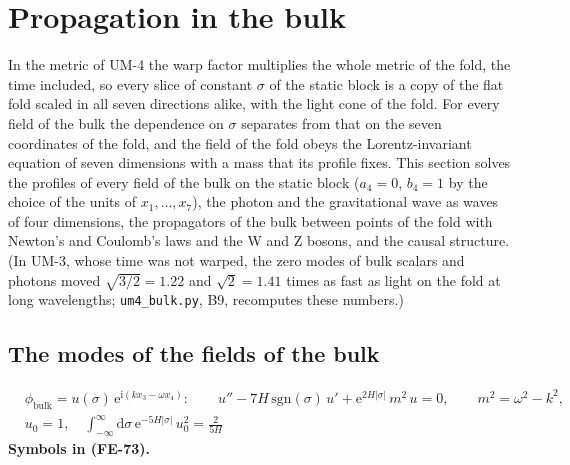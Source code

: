 \documentclass[
  10pt,
]{article}
\begin{document}
\hypertarget{propagation-in-the-bulk}{%
\section{Propagation in the bulk}\label{propagation-in-the-bulk}}

In the metric of UM-4 the warp factor multiplies the whole metric of the
fold, the time included, so every slice of constant \(\sigma\) of the
static block is a copy of the flat fold scaled in all seven directions
alike, with the light cone of the fold. For every field of the bulk the
dependence on \(\sigma\) separates from that on the seven coordinates of
the fold, and the field of the fold obeys the Lorentz-invariant equation
of seven dimensions with a mass that its profile fixes. This section
solves the profiles of every field of the bulk on the static block
(\(a_4 = 0\), \(b_4 = 1\) by the choice of the units of
\(x_1, \dots, x_7\)), the photon and the gravitational wave as waves of
four dimensions, the propagators of the bulk between points of the fold
with Newton's and Coulomb's laws and the W and Z bosons, and the causal
structure. (In UM-3, whose time was not warped, the zero modes of bulk
scalars and photons moved \(\sqrt{3/2} = 1.22\) and \(\sqrt2 = 1.41\)
times as fast as light on the fold at long wavelengths;
\texttt{um4\_bulk.py}, B9, recomputes these numbers.)

\hypertarget{the-modes-of-the-fields-of-the-bulk}{%
\subsection{The modes of the fields of the
bulk}\label{the-modes-of-the-fields-of-the-bulk}}

\[
\begin{aligned}
&\phi_{\mathrm{bulk}} = u(\sigma)\,\mathrm{e}^{\mathrm{i}(kx_3 - \omega x_4)}:\qquad
u'' - 7H\,\mathrm{sgn}(\sigma)\,u' + \mathrm{e}^{2H\lvert\sigma\rvert}\,m^2\,u = 0,\qquad m^2 = \omega^2 - k^2,\\
&u_0 = 1,\quad \int_{-\infty}^{\infty}\mathrm{d}\sigma\,\mathrm{e}^{-5H\lvert\sigma\rvert}\,u_0^2 = \frac{2}{5H}
\end{aligned} \tag{FE-73}
\] \textbf{Symbols in (FE-73).}
\end{document}
